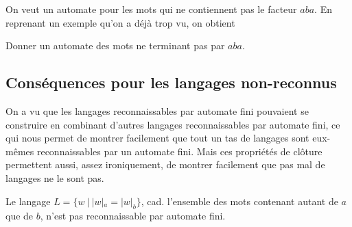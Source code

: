 \begin{example}
On veut un automate pour les mots qui ne contiennent pas le facteur $aba$. En reprenant un exemple qu'on a déjà trop vu, on obtient 


\begin{figure}[H]
\centering
{}
\end{figure}
\end{example}

\begin{exercice}
Donner un automate des mots ne terminant pas par $aba$.
\end{exercice}


\subsection{Conséquences pour les langages non-reconnus}

On a vu que les langages reconnaissables par automate fini pouvaient se construire en combinant d'autres langages reconnaissables par automate fini, ce qui nous permet de montrer facilement que tout un tas de langages sont eux-mêmes reconnaissables par un automate fini. Mais ces propriétés de clôture permettent aussi, assez ironiquement, de montrer facilement que pas mal de langages ne le sont pas.

\begin{theorem}
Le langage $L = \{w ~|~ |w|_a = |w|_b\}$, cad. l'ensemble des mots contenant autant de $a$ que de $b$, n'est pas reconnaissable par automate fini.
\end{theorem}

